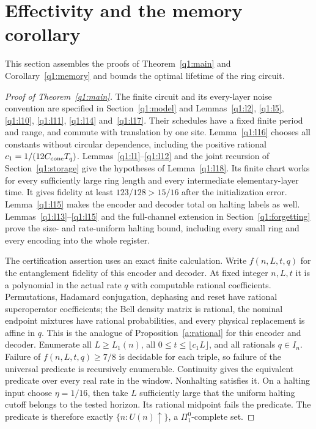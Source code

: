 \section{Effectivity and the memory corollary}\label{q1:effective}
This section assembles the proofs of Theorem~\ref{q1:main} and Corollary~\ref{q1:memory} and bounds the optimal lifetime of the ring circuit.

\begin{proof}[Proof of Theorem~\ref{q1:main}]
The finite circuit and its every-layer noise convention are specified in Section~\ref{q1:model} and Lemmas~\ref{q1:l2}, \ref{q1:l5}, \ref{q1:l10}, \ref{q1:l11}, \ref{q1:l14} and~\ref{q1:l17}. Their schedules have a fixed finite period and range, and commute with translation by one site. Lemma~\ref{q1:l16} chooses all constants without circular dependence, including the positive rational \(c_1=1/(12C_{\rm cone}T_q)\). Lemmas~\ref{q1:l1}--\ref{q1:l12} and the joint recursion of Section~\ref{q1:storage} give the hypotheses of Lemma~\ref{q1:l18}. Its finite chart works for every sufficiently large ring length and every intermediate elementary-layer time. It gives fidelity at least \(123/128>15/16\) after the initialization error. Lemma~\ref{q1:l15} makes the encoder and decoder total on halting labels as well. Lemmas~\ref{q1:l13}--\ref{q1:l15} and the full-channel extension in Section~\ref{q1:forgetting} prove the size- and rate-uniform halting bound, including every small ring and every encoding into the whole register.

The certification assertion uses an exact finite calculation. Write \(f(n,L,t,q)\) for the entanglement fidelity of this encoder and decoder. At fixed integer \(n,L,t\) it is a polynomial in the actual rate \(q\) with computable rational coefficients. Permutations, Hadamard conjugation, dephasing and reset have rational superoperator coefficients; the Bell density matrix is rational, the nominal endpoint mixtures have rational probabilities, and every physical replacement is affine in \(q\). This is the analogue of Proposition~\ref{a:rational} for this encoder and decoder. Enumerate all \(L\ge L_1(n)\), all \(0\le t\le\lfloor c_1L\rfloor\), and all rationals \(q\in I_n\). Failure of \(f(n,L,t,q)\ge7/8\) is decidable for each triple, so failure of the universal predicate is recursively enumerable. Continuity gives the equivalent predicate over every real rate in the window. Nonhalting satisfies it. On a halting input choose \(\eta=1/16\), then take \(L\) sufficiently large that the uniform halting cutoff belongs to the tested horizon. Its rational midpoint fails the predicate. The predicate is therefore exactly \(\{n:U(n)\uparrow\}\), a \(\Pi^0_1\)-complete set.


\end{proof}
